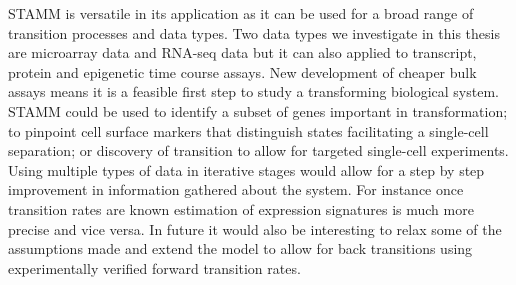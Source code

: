 STAMM is versatile in its application as it can be used for a broad range of transition processes and data types. Two data types we investigate in this thesis are microarray data and RNA-seq data but it can also applied to transcript, protein and epigenetic time course assays. New development of cheaper bulk assays means it is a feasible first step to study a transforming biological system. STAMM could be used to identify a subset of genes important in transformation; to pinpoint cell surface markers that distinguish states facilitating a single-cell separation; or discovery of transition to allow for targeted single-cell experiments. Using multiple types of data in iterative stages would allow for a step by step improvement in information gathered about the system. For instance once transition rates are known estimation of expression signatures is much more precise and vice versa. In future it would also be interesting to relax some of the assumptions made and extend the model to allow for back transitions using experimentally verified forward transition rates.


